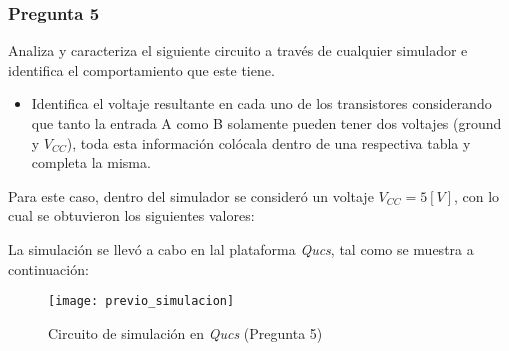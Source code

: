 \documentclass[../procedimientos.tex]{subfiles}
\begin{document}
\subsubsection*{Pregunta 5}
\begin{em}
  Analiza y caracteriza el siguiente circuito a través de cualquier simulador 
  e identifica el comportamiento que este tiene.
  \begin{itemize}
    \item Identifica el voltaje resultante en cada uno de los transistores 
      considerando que tanto la entrada A como B solamente pueden tener dos 
      voltajes (ground y $V_{CC}$), toda esta información colócala dentro de 
      una respectiva tabla y completa la misma.
  \end{itemize}
\end{em}

Para este caso, dentro del simulador se consideró un voltaje $V_{CC} = 5 [V]$, 
con lo cual se obtuvieron los siguientes valores:

\begin{table}[H]
  \centering
  \caption{Voltajes de la simulación (Pregunta 5)}
\end{table}

La simulación se llevó a cabo en lal plataforma \textit{Qucs}, tal como se 
muestra a continuación:
\begin{figure}[H]
  \centering
  \texttt{[image: previo\_simulacion]}
  \caption{Circuito de simulación en \textit{Qucs} (Pregunta 5)}
\end{figure}
\end{document}
